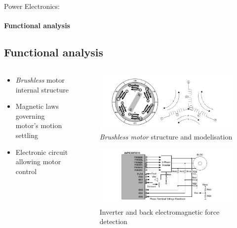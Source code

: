 \documentclass{beamer}
\begin{document}
	\begin{frame}{Power Electronics:}
		\framesubtitle{Functional analysis}
		\subsection[Func analysis]{Functional analysis}
		\begin{columns}[T]
	  		\begin{column}{0.4\textwidth}
				\begin{itemize}
					\item \textit{Brushless} motor internal structure
					\item Magnetic laws governing motor's motion settling
					\item Electronic circuit allowing motor control
				\end{itemize}
	  		\end{column}
	  		\begin{column}{0.6\textwidth}
	  			\vspace{-1em}
	  			\begin{figure}
	  				\begin{center}
	  					\includegraphics[height=0.3\textheight]{../Illus/struct_bldcm.png}
	  				\end{center}
	    			\caption{\textit{Brushless motor} structure and modelisation}
	    		\end{figure}
	    		\vspace{-2em}
	  			\begin{figure}
	  				\begin{center}
	  					\includegraphics[height=0.3\textheight]{../Illus/back_emf_scheme.png}
	  				\end{center}
	    			\caption{Inverter and back electromagnetic force detection}
	    		\end{figure}
	  		\end{column}
		\end{columns}

	\end{frame}	
		
\end{document}
